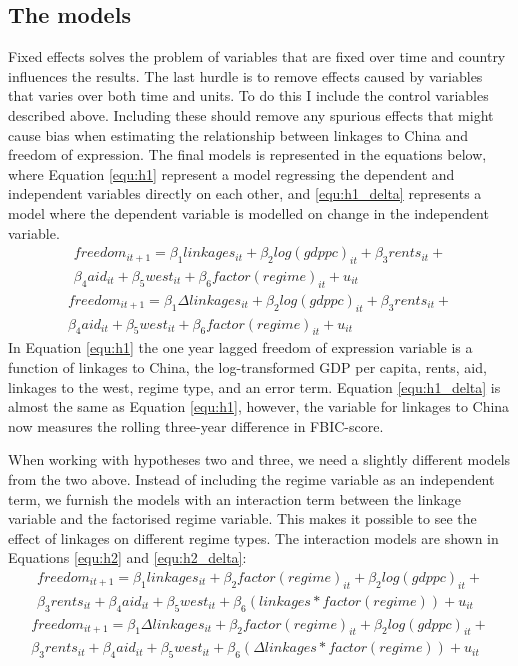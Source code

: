 \subsection{The models}
Fixed effects solves the problem of variables that are fixed over time and country influences the results. The last hurdle is to remove effects caused by variables that varies over both time and units. To do this I include the control variables described above. Including these should remove any spurious effects that might cause bias when estimating the relationship between linkages to China and freedom of expression. The final models is represented in the equations below, where Equation \ref{equ:h1} represent a model regressing the dependent and independent variables directly on each other, and \ref{equ:h1_delta} represents a model where the dependent variable is modelled on change in the independent variable.
\begin{multline} \label{equ:h1}
    freedom_{it+1} = \beta_1  linkages_{it} + \beta_2 log(gdppc)_{it} + \beta_3 rents_{it} + \\\beta_4aid_{it} + \beta_5 west_{it} + \beta_6  factor(regime)_{it} + u_{it}
\end{multline}
\begin{multline} \label{equ:h1_delta}
    freedom_{it+1} = \beta_1 \Delta linkages_{it} + \beta_2 log(gdppc)_{it} + \beta_3rents_{it} + \\\beta_4aid_{it} + \beta_5west_{it} + \beta_6 factor(regime)_{it} + u_{it}
\end{multline}
In Equation \ref{equ:h1} the one year lagged freedom of expression variable is a function of  linkages to China, the log-transformed GDP per capita, rents, aid, linkages to the west, regime type, and an error term. Equation \ref{equ:h1_delta}
is almost the same as Equation \ref{equ:h1}, however, the variable for linkages to China now measures the rolling three-year difference in FBIC-score. 

When working with hypotheses two and three, we need a slightly different models from the two above. Instead of including the regime variable as an independent term, we furnish the models with an interaction term between the linkage variable and the factorised regime variable. This makes it possible to see the effect of linkages on different regime types. The interaction models are shown in Equations \ref{equ:h2} and \ref{equ:h2_delta}:
\begin{multline} \label{equ:h2}
    freedom_{it+1} = \beta_1 linkages_{it} + \beta_2 factor(regime)_{it} + \beta_2 log(gdppc)_{it} + \\ \beta_3 rents_{it} + \beta_4 aid_{it} + \beta_5 west_{it} + \beta_6 (linkages * factor(regime)) + u_{it}
\end{multline}
\begin{multline} \label{equ:h2_delta}
    freedom_{it+1} = \beta_1 \Delta linkages_{it} + \beta_2 factor(regime)_{it} + \beta_2 log(gdppc)_{it} + \\ \beta_3 rents_{it} + \beta_4 aid_{it} + \beta_5 west_{it} + \beta_6 (\Delta linkages * factor(regime)) + u_{it}
\end{multline}